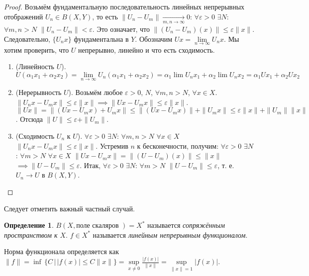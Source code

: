 \documentclass[11pt,openany,a4paper]{scrartcl}
\theoremstyle{plain}
\theoremstyle{definition}
\newtheorem{definition}[theorem]{Определение}
\newcommand{\underto}[1]{\xrightarrow[#1]{}}
\begin{document}
\begin{proof}
    Возьмём фундаментальную последовательность линейных непрерывных отображений
    $U_n \in B(X, Y)$, то есть $\|U_n - U_m\| \underto{m,n \to \infty} 0$:
    $\forall \varepsilon>0$ $\exists N:$ $\forall m,n > N$ $\|U_n - U_m\| < \varepsilon$.
    Это означает, что $\|(U_n - U_m)(x)\| \leqslant \varepsilon \|x\|$. Следовательно,
    $\{U_nx\}$ фундаментальна в $Y$. Обозначим $Ux = \lim\limits_{n \to \infty}
    U_nx$. Мы хотим проверить, что $U$ непрерывно, линейно и что есть сходимость.
    \begin{enumerate}
        \item (Линейность $U$). $U(\alpha_1x_1 + \alpha_2x_2) = \lim\limits_{n \to \infty}
        U_n(\alpha_1x_1 + \alpha_2x_2) = 
        \alpha_1 \lim U_nx_1 + \alpha_2\lim U_nx_2 = \alpha_1 Ux_1 +
        \alpha_2 Ux_2$
        \item (Нерерывность $U$). Возьмём любое $\varepsilon > 0$, $N$, $\forall m,n>N$,
        $\forall x\in X$. $\|U_nx - U_mx\| \leqslant \varepsilon \|x\| \implies
        \|Ux - U_mx\| \leqslant \varepsilon\|x\|$.
        $\|Ux\| = \|(Ux - U_mx) + U_mx\| \leqslant \|(Ux - U_mx)\| + \|U_mx\| \leqslant
        \varepsilon \|x\| + \|U_m\|\|x\|$. Отсюда $\|U\| \leqslant \varepsilon +
        \|U_m\|$.
        \item (Сходимость $U_n$ к $U$).
        $\forall \varepsilon > 0$ $\exists N$: $\forall m,n>N$ $\forall x\in X$ $
        \|U_nx - U_mx\| \leqslant \varepsilon \|x\|$. Устремив $n$ к бесконечности, 
        получим: $\forall \varepsilon > 0$ $\exists N$: $\forall m > N$
        $\forall x\in X$ $\|Ux - U_mx\| = \|(U - U_m)(x)\| \leqslant \|x\|$
        $\implies \|U - U_m\| \leqslant \varepsilon$. Итак,
        $\forall \varepsilon > 0$ $\exists N$: $\forall m > N$
        $\|U - U_m\| \leqslant \varepsilon$, т. е. $U_n \to U$ в $B(X, Y)$.
    \end{enumerate}
\end{proof}

Следует отметить важный частный случай.
\begin{definition}
    $B (X, \text{поле скаляров }) = X^\ast$ называется
    \emph{сопряжённым пространством к $X$}. $f \in X^\ast$ называется \emph{линейным
    непрерывным функционалом}.
\end{definition}

Норма функционала определяется как $\|f\| = \inf\,\{C\,\big|\,|f(x)|
\leqslant C\|x\|\} =
\sup\limits_{x \neq 0}\frac{|f(x)|}{\|x\|} = \sup\limits_{\|x\|=1} |f(x)|$.
\end{document}
